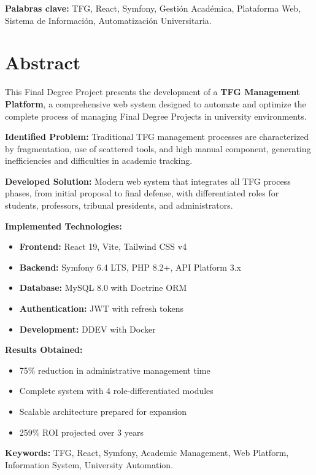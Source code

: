 \textbf{Palabras clave:} TFG, React, Symfony, Gestión Académica, Plataforma Web, 
Sistema de Información, Automatización Universitaria.

\newpage
\chapter*{Abstract}

This Final Degree Project presents the development of a \textbf{TFG Management 
Platform}, a comprehensive web system designed to automate and optimize the 
complete process of managing Final Degree Projects in university environments.

\textbf{Identified Problem:} Traditional TFG management processes are 
characterized by fragmentation, use of scattered tools, and high manual 
component, generating inefficiencies and difficulties in academic tracking.

\textbf{Developed Solution:} Modern web system that integrates all TFG process 
phases, from initial proposal to final defense, with differentiated roles for 
students, professors, tribunal presidents, and administrators.

\textbf{Implemented Technologies:}
\begin{itemize}
    \item \textbf{Frontend:} React 19, Vite, Tailwind CSS v4
    \item \textbf{Backend:} Symfony 6.4 LTS, PHP 8.2+, API Platform 3.x
    \item \textbf{Database:} MySQL 8.0 with Doctrine ORM
    \item \textbf{Authentication:} JWT with refresh tokens
    \item \textbf{Development:} DDEV with Docker
\end{itemize}

\textbf{Results Obtained:}
\begin{itemize}
    \item 75\% reduction in administrative management time
    \item Complete system with 4 role-differentiated modules
    \item Scalable architecture prepared for expansion
    \item 259\% ROI projected over 3 years
\end{itemize}

\textbf{Keywords:} TFG, React, Symfony, Academic Management, Web Platform, 
Information System, University Automation.
